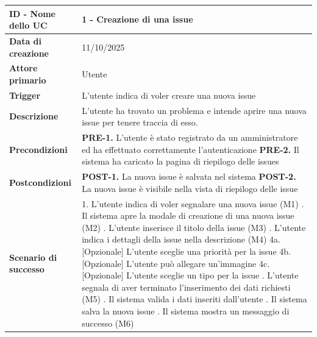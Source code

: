 \begin{longtable}{|p{4cm}|p{11cm}|}
    \hline
    \textbf{ID - Nome dello UC} & 1 - Creazione di una issue \cite{uc1-figma} \\
    \hline
    \textbf{Data di creazione} & 11/10/2025 \\
    \hline
    \textbf{Attore primario} & Utente \\
    \hline
    \textbf{Trigger} & L'utente indica di voler creare una nuova issue \\
    \hline
    \textbf{Descrizione} & L'utente ha trovato un problema e intende aprire una nuova issue per tenere traccia di esso. \\
    \hline
    \textbf{Precondizioni} & \textbf{PRE-1.} L'utente è stato registrato da un amministratore ed ha effettuato correttamente l'autenticazione \newline
    \textbf{PRE-2.} Il sistema ha caricato la pagina di riepilogo delle issues \\
    \hline
    \textbf{Postcondizioni} & \textbf{POST-1.} La nuova issue è salvata nel sistema \newline
    \textbf{POST-2.} La nuova issue è visibile nella vista di riepilogo delle issue \\
    \hline
    \textbf{Scenario di successo} & 1. L'utente indica di voler segnalare una nuova issue (M1) \newline
    2. Il sistema apre la modale di creazione di una nuova issue (M2) \newline
    3. L'utente inserisce il titolo della issue (M3) \newline
    4. L'utente indica i dettagli della issue nella descrizione (M4) \newline
    4a. [Opzionale] L'utente sceglie una priorità per la issue \newline
    4b. [Opzionale] L'utente può allegare un'immagine \newline
    4c. [Opzionale] L'utente sceglie un tipo per la issue \newline
    5. L'utente segnala di aver terminato l'inserimento dei dati richiesti (M5) \newline
    6. Il sistema valida i dati inseriti dall'utente \newline
    7. Il sistema salva la nuova issue \newline
    8. Il sistema mostra un messaggio di successo (M6) \\
    \hline


\end{longtable}
